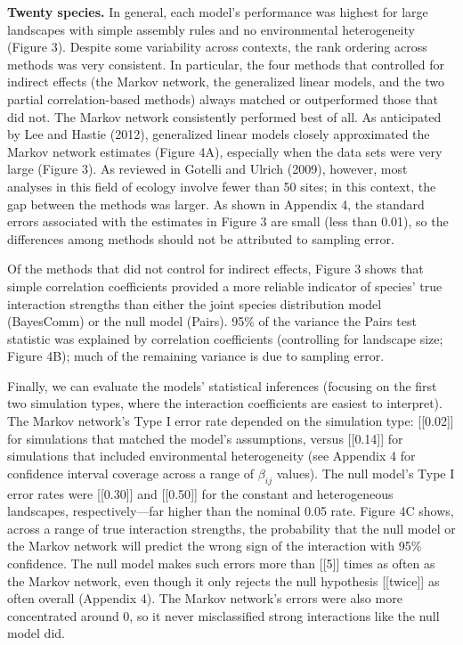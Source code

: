 \documentclass[12pt,]{article}
\begin{document}
\begin{spacing}{1.9}
\begin{flushleft}
\noindent
\textbf{Twenty species.} In general, each model's performance was
highest for large landscapes with simple assembly rules and no
environmental heterogeneity (Figure 3). Despite some variability across
contexts, the rank ordering across methods was very consistent. In
particular, the four methods that controlled for indirect effects (the
Markov network, the generalized linear models, and the two partial
correlation-based methods) always matched or outperformed those that did
not. The Markov network consistently performed best of all. As
anticipated by Lee and Hastie (2012), generalized linear models closely
approximated the Markov network estimates (Figure 4A), especially when
the data sets were very large (Figure 3). As reviewed in Gotelli and
Ulrich (2009), however, most analyses in this field of ecology involve
fewer than 50 sites; in this context, the gap between the methods was
larger. As shown in Appendix 4, the standard errors associated with the
estimates in Figure 3 are small (less than 0.01), so the differences
among methods should not be attributed to sampling error.

Of the methods that did not control for indirect effects, Figure 3 shows
that simple correlation coefficients provided a more reliable indicator
of species' true interaction strengths than either the joint species
distribution model (BayesComm) or the null model (Pairs). 95\% of the
variance the Pairs test statistic was explained by correlation
coefficients (controlling for landscape size; Figure 4B); much of the
remaining variance is due to sampling error.

Finally, we can evaluate the models' statistical inferences (focusing on
the first two simulation types, where the interaction coefficients are
easiest to interpret). The Markov network's Type I error rate depended
on the simulation type: {[}{[}0.02{]}{]} for simulations that matched
the model's assumptions, versus {[}{[}0.14{]}{]} for simulations that
included environmental heterogeneity (see Appendix 4 for confidence
interval coverage across a range of \(\beta_{ij}\) values). The null
model's Type I error rates were {[}{[}0.30{]}{]} and {[}{[}0.50{]}{]}
for the constant and heterogeneous landscapes, respectively---far higher
than the nominal 0.05 rate. Figure 4C shows, across a range of true
interaction strengths, the probability that the null model or the Markov
network will predict the wrong sign of the interaction with 95\%
confidence. The null model makes such errors more than {[}{[}5{]}{]}
times as often as the Markov network, even though it only rejects the
null hypothesis {[}{[}twice{]}{]} as often overall (Appendix 4). The
Markov network's errors were also more concentrated around 0, so it
never misclassified strong interactions like the null model did.


\end{flushleft}
\end{spacing}
\end{document}
